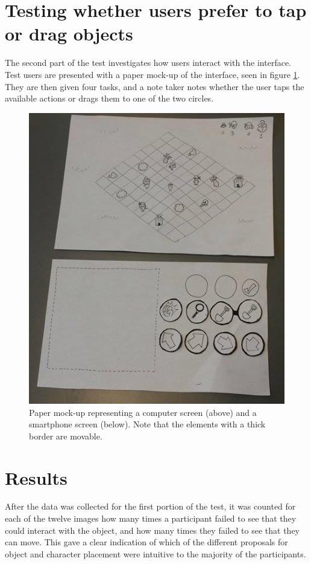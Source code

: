 \section{Testing whether users prefer to tap or drag objects}
The second part of the test investigates how users interact with the interface. Test users are presented with a paper mock-up of the interface, seen in figure \ref{fig:mockup}. They are then given four tasks, and a note taker notes whether the user taps the available actions or drags them to one of the two circles.

\begin{figure}[h!]
	\centering
	\includegraphics[scale=0.7]{figures/paper_1.jpg}
	\caption{Paper mock-up representing a computer screen (above) and a smartphone screen (below). Note that the elements with a thick border are movable. \label{fig:mockup}}
\end{figure}

\section{Results}
After the data was collected for the first portion of the test, it was counted for each of the twelve images how many times a participant failed to see that they could interact with the object, and how many times they failed to see that they can move. This gave a clear indication of which of the different proposals for object and character placement were intuitive to the majority of the participants.

